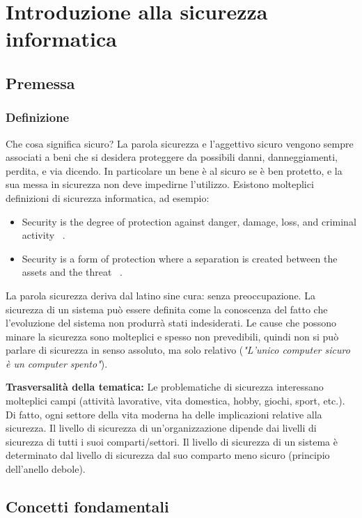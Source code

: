 \chapter{Introduzione alla sicurezza informatica}


\section{Premessa}

\subsection{Definizione}
Che cosa significa sicuro? La parola sicurezza e l’aggettivo sicuro vengono sempre associati a beni che si desidera proteggere da possibili danni, danneggiamenti, perdita, e via dicendo. In particolare un bene è al sicuro se è ben protetto, e la sua messa in sicurezza non deve impedirne l'utilizzo. Esistono molteplici definizioni di sicurezza informatica, ad esempio:
\begin{itemize} 
  \item Security is the degree of protection against danger, damage, loss, and criminal activity ~\cite{wikiSecurity}.
  \item Security is a form of protection where a separation is created between the assets and the threat ~\cite{isecomSecurity}.
\end{itemize}
La parola sicurezza deriva dal latino sine cura: senza preoccupazione. La sicurezza di un sistema può essere definita come la conoscenza del fatto che l’evoluzione del sistema non produrrà stati indesiderati. Le cause che possono minare la sicurezza sono molteplici e spesso
non prevedibili, quindi non si può parlare di sicurezza in senso assoluto, ma solo relativo (\textit{"L'unico computer sicuro è un computer spento"}).

\textbf{Trasversalità della tematica:} Le problematiche di sicurezza interessano molteplici campi (attività lavorative, vita domestica, hobby, giochi, sport, etc.). Di fatto, ogni settore della vita moderna ha delle implicazioni relative alla sicurezza. Il livello di sicurezza di un'organizzazione dipende dai livelli di sicurezza di tutti i suoi comparti/settori. Il livello di sicurezza di un sistema è determinato dal livello di sicurezza dal suo comparto meno sicuro (principio dell'anello debole).


\section{Concetti fondamentali}

